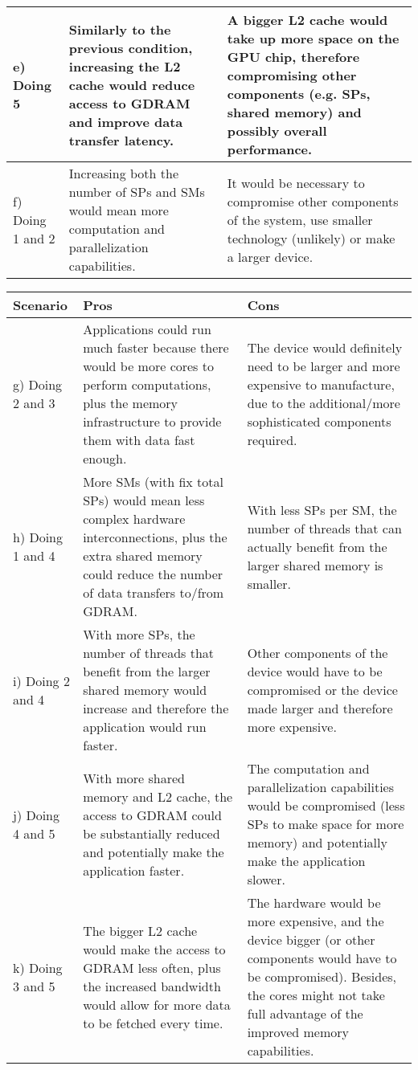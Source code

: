 \documentclass{article}
\begin{document}
\begin{enumerate}[1.]
\begin{table}[h!t]
\begin{tabular}{p{1.5cm}p{6cm}p{6cm}}
		\midrule
		e) Doing 5 &
		Similarly to the previous condition, increasing the L2 cache would reduce access to GDRAM and improve data transfer latency. & 
		A bigger L2 cache would take up more space on the GPU chip, therefore compromising other components (e.g. SPs, shared memory) and possibly overall performance. \\
		\midrule
		f) Doing 1 and 2 &
		Increasing both the number of SPs and SMs would mean more computation and parallelization capabilities. & 
		It would be necessary to compromise other components of the system, use smaller technology (unlikely) or make a larger device. \\
		\midrule
	\end{tabular}
    \end{table}
    \newpage
    \begin{table}[h!t]
	\centering
	\begin{tabular}{p{1.5cm}p{5.5cm}p{5.5cm}}
		\toprule
		\textbf{Scenario} & \textbf{Pros} & \textbf{Cons}\\
		\midrule
		g) Doing 2 and 3 &
		Applications could run much faster because there would be more cores to perform computations, plus the memory infrastructure to provide them with data fast enough. & 
		The device would definitely need to be larger and more expensive to manufacture, due to the additional/more sophisticated components required. \\
		\midrule
		h) Doing 1 and 4 &
		More SMs (with fix total SPs) would mean less complex hardware interconnections, plus the extra shared memory could reduce the number of data transfers to/from GDRAM. & 
		With less SPs per SM, the number of threads that can actually benefit from the larger shared memory is smaller. \\
		\midrule
		i) Doing 2 and 4 &
		With more SPs, the number of threads that benefit from the larger shared memory would increase and therefore the application would run faster. & 
		Other components of the device would have to be compromised or the device made larger and therefore more expensive. \\
		\midrule
		j) Doing 4 and 5 &
		With more shared memory and L2 cache, the access to GDRAM could be substantially reduced and potentially make the application faster. & 
		The computation and parallelization capabilities would be compromised (less SPs to make space for more memory) and potentially make the application slower. \\
		\midrule
		k) Doing 3 and 5 &
		The bigger L2 cache would make the access to GDRAM less often, plus the increased bandwidth would allow for more data to be fetched every time. & 
		The hardware would be more expensive, and the device bigger (or other components would have to be compromised). Besides, the cores might not take full advantage of the improved memory capabilities. \\
		\bottomrule
		\end{tabular}
    \end{table}
    

\end{enumerate}
\end{document}

